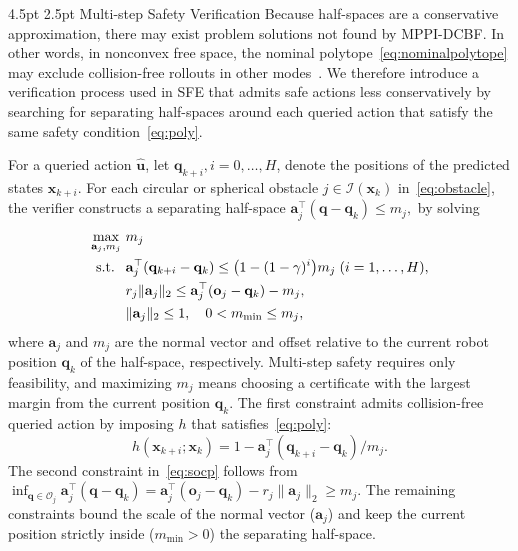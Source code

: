 \documentclass[letterpaper, 10 pt, conference]{ieeeconf}
\makeatletter
\newcommand{\q}{\mathbf{q}}
\newcommand{\qk}{\mathbf{\q}_{k}}
\newcommand{\qki}{\mathbf{\q}_{k+i}}
\newcommand{\x}{\mathbf{x}}
\newcommand{\xk}{\mathbf{x}_{k}}
\newcommand{\xki}{\mathbf{x}_{k+i}}
\newcommand{\aj}{\mathbf{a}_{j}}
\newcommand{\oj}{\mathbf{o}_{j}}
\renewcommand{\subsection}{%
  \@startsection{subsection}{2}{\z@}%
  {4.5pt}%
  {2.5pt}%
  {\normalfont\normalsize\itshape}}
\makeatother
\begin{document}
\subsection{Multi-step Safety Verification}
Because half-spaces are a conservative approximation, there may exist problem solutions not found by MPPI-DCBF. In other words, in nonconvex free space, the nominal polytope~\eqref{eq:nominalpolytope} may exclude collision-free rollouts in other modes~\cite{deits2015computing}. We therefore introduce a verification process used in SFE that admits safe actions less conservatively by searching for separating half-spaces around each queried action that satisfy the same safety condition~\eqref{eq:poly}.

For a queried action $\hat{\mathbf u}$, let $\q_{k+i},i\!=\!0,\!\ldots\!,H$, denote the positions of the predicted states $\x_{k+i}$. 
For each circular or spherical obstacle $j\in\mathcal I(\xk)$ in~\eqref{eq:obstacle}, the verifier constructs a separating half-space \(\mathbf a_j^\top(\mathbf q-\qk)\le m_j,\) 
by solving
\noindent
\begin{align}
\max_{\aj,m_j}\ & m_j \label{eq:socp}\\
\text{s.t. }\ &
\aj^\top(\qki-\qk)\le\big(1-(1-\gamma)^i\big)m_j
\; (i=1,\dots,H), \notag\\
& r_j\|\aj\|_2\le \aj^\top(\oj-\qk)-m_j, \notag\\
& \|\aj\|_2\le1,\quad 0<m_{\min}\le m_j, \notag
\end{align}
where $\aj$ and $m_j$ are the normal vector and offset relative to the current robot position $\qk$ of the half-space, respectively. Multi-step safety requires only feasibility, and maximizing $m_j$ means choosing a certificate with the largest margin from the current position $\qk$. 
The first constraint admits collision-free queried action by imposing $h$ that satisfies~\eqref{eq:poly}:
\begin{equation}
\label{eq:constructed-safety-function}
h(\xki;\xk)=1-\aj^\top(\qki-\qk)/m_j.
\end{equation}
The second constraint in~\eqref{eq:socp} follows from \(
\inf_{\q\in\mathcal O_j}\aj^\top\!(\q\!-\!\qk)\!=\!\aj^\top(\oj\!-\!\qk)\!-\!r_j\|\aj\|_2\!\ge\! m_j.
\)
The remaining constraints bound the scale of the normal vector ($\aj$) and keep the current position strictly inside ($m_{\min}\!>\!0$) the separating half-space.
\end{document}

